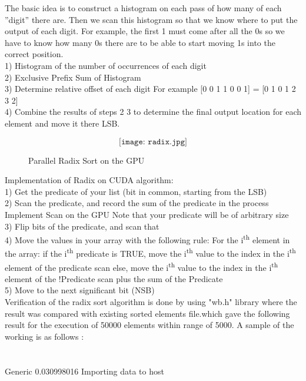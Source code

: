 \documentclass[conference]{IEEEtran}
\begin{document}
The basic idea is to construct a histogram on each pass
of how many of each ”digit” there are. Then we scan this
histogram so that we know where to put the output of each
digit. For example, the first 1 must come after all the 0s so
we have to know how many 0s there are to be able to start
moving 1s into the correct position.
\\1) Histogram of the number of occurrences of each digit
\\2) Exclusive Prefix Sum of Histogram
\\3) Determine relative offset of each digit
For example [0 0 1 1 0 0 1] = [0 1 0 1 2 3 2]
\\4) Combine the results of steps 2 3 to determine the final
output location for each element and move it there LSB.
\begin{figure}[h]
\[\texttt{[image: radix.jpg]}\]
\caption{Parallel Radix Sort on the GPU}
\end{figure}

Implementation of Radix on CUDA algorithm:
\\1) Get the predicate of your list (bit in common, starting
from the LSB)
\\2) Scan the predicate, and record the sum of the predicate in
the process
Implement Scan on the GPU
Note that your predicate will be of arbitrary size
\\3) Flip bits of the predicate, and scan that
\\4) Move the values in your array with the following rule:
For the i\textsuperscript{th} element in the array:
if the i\textsuperscript{th} predicate is TRUE, move the i\textsuperscript{th} value to the index
in the i\textsuperscript{th} element of the predicate scan
else, move the i\textsuperscript{th} value to the index in the i\textsuperscript{th} element of the
!Predicate scan plus the sum of the Predicate
\\5) Move to the next significant bit (NSB)\\

Verification of the radix sort algorithm is done by using "wb.h" library where the result was compared with existing sorted elements file.which gave the following result for the execution of 50000 elements within range of 5000.
A sample of the working is as follows :
\\


\\\\ Generic 0.030998016 Importing data to host
\end{document}
